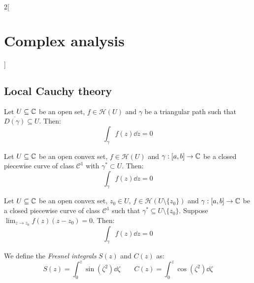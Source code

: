 \documentclass[../../../main_math.tex]{subfiles}
\begin{document}
\begin{multicols}{2}[\section{Complex analysis}]
  \subsection{Local Cauchy theory}
  \begin{theorem}
    Let $U\subseteq \mathbb{C}$ be an open set, $f\in\mathcal{H}(U)$ and $\gamma$ be a triangular path such that $\overline{D(\gamma)}\subseteq U$. Then: $$\int_\gamma f(z)\dd{z}=0$$
  \end{theorem}
  \begin{theorem}
    Let $U\subseteq \mathbb{C}$ be an open convex set, $f\in\mathcal{H}(U)$ and $\gamma:[a,b]\rightarrow\mathbb{C}$ be a closed piecewise curve of class $\mathcal{C}^1$ with $\gamma^*\subset U$. Then: $$\int_\gamma f(z)\dd{z}=0$$
  \end{theorem}
  \begin{lemma}
    Let $U\subseteq \mathbb{C}$ be an open convex set, $z_0\in U$, $f\in\mathcal{H}(U\setminus\{z_0\})$ and $\gamma:[a,b]\rightarrow\mathbb{C}$ be a closed piecewise curve of class $\mathcal{C}^1$ such that $\gamma^*\subseteq U\setminus\{z_0\}$. Suppose $\displaystyle\lim_{z\to z_0}f(z)(z-z_0)=0$. Then: $$\int_\gamma f(z)\dd{z}=0$$
  \end{lemma}
  \begin{definition}
    We define the \emph{Fresnel integrals} $S(z)$ and $C(z)$ as:
    $$S(z)=\int_0^z\sin(\zeta^2)\dd{\zeta}\qquad C(z)=\int_0^z\cos(\zeta^2)\dd{\zeta}$$
  \end{definition}

\end{multicols}
\end{document}
